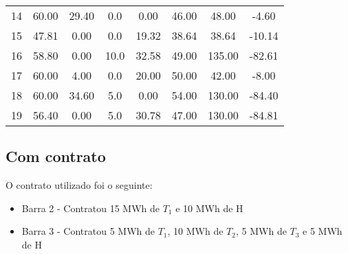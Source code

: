 \documentclass[a4paper,12pt,twoside]{article}
\begin{document}
\begin{center}
\begin{tabular}{ c c c c c c c c }
        14   & 60.00    & 29.40      & 0.0   & 0.00   & 46.00   & 48.00   & -4.60 \\
        15   & 47.81     & 0.00      & 0.0  & 19.32   & 38.64   & 38.64  & -10.14 \\
        16   & 58.80     & 0.00     & 10.0  & 32.58   & 49.00  & 135.00  & -82.61 \\
        17   & 60.00     & 4.00      & 0.0  & 20.00   & 50.00   & 42.00   & -8.00 \\
        18   & 60.00    & 34.60      & 5.0   & 0.00   & 54.00  & 130.00  & -84.40 \\
        19   & 56.40     & 0.00      & 5.0  & 30.78   & 47.00  & 130.00  & -84.81
    \end{tabular}
\end{center}

\subsection{Com contrato}
O contrato utilizado foi o seguinte:
\begin{itemize}
    \item{Barra 2 - Contratou 15 MWh de \(T_1\) e 10 MWh de H}
    \item{Barra 3 - Contratou 5 MWh de \(T_1\), 10 MWh de \(T_2\), 5 MWh de \(T_3\) e 5 MWh de H}
\end{itemize}
\end{document}
